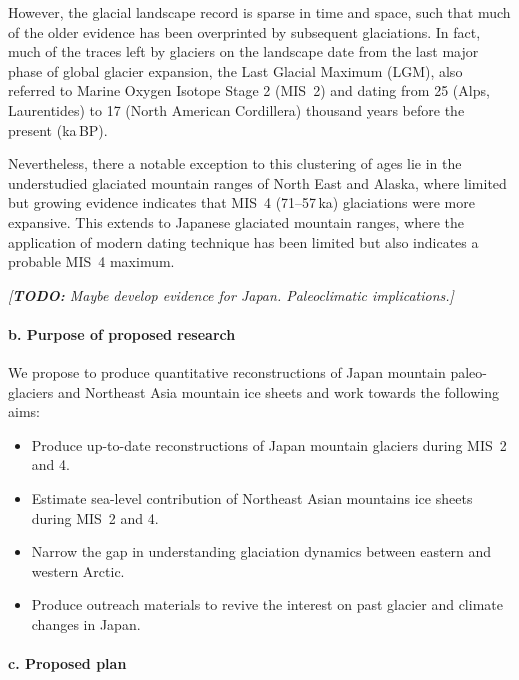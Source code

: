 \documentclass{article}
\newcommand{\todo}[1]{\textcolor{c3}{\emph{[\textbf{TODO:} #1]}}}
\begin{document}
    However, the glacial landscape record is sparse in time and space, such that
    much of the older evidence has been overprinted by subsequent glaciations.
    In fact, much of the traces left by glaciers on the landscape date from the
    last major phase of global glacier expansion, the Last Glacial Maximum
    (LGM), also referred to Marine Oxygen Isotope Stage 2 (MIS~2) and dating
    from 25 (Alps, Laurentides) to 17 (North American Cordillera) thousand
    years before the present (ka\,BP).

    Nevertheless, there a notable exception to this clustering of ages lie in
    the understudied glaciated mountain ranges of North East and Alaska, where
    limited but growing evidence indicates that MIS~4 (71--57\,ka) glaciations
    were more expansive. This extends to Japanese glaciated mountain ranges,
    where the application of modern dating technique has been limited but also
    indicates a probable MIS~4 maximum.

    \todo{Maybe develop evidence for Japan. Paleoclimatic implications.}


\paragraph{b. Purpose of proposed research}

    We propose to produce quantitative reconstructions of Japan mountain
    paleo-glaciers and Northeast Asia mountain ice sheets and work towards the
    following aims:

    \begin{itemize}
      \item{Produce up-to-date reconstructions of Japan mountain glaciers
            during MIS~2 and 4.}
      \item{Estimate sea-level contribution of Northeast Asian mountains ice
            sheets during MIS~2 and 4.}
      \item{Narrow the gap in understanding glaciation dynamics between
            eastern and western Arctic.}
      \item{Produce outreach materials to revive the interest on past glacier
            and climate changes in Japan.}
    \end{itemize}


\paragraph{c. Proposed plan}
\end{document}
